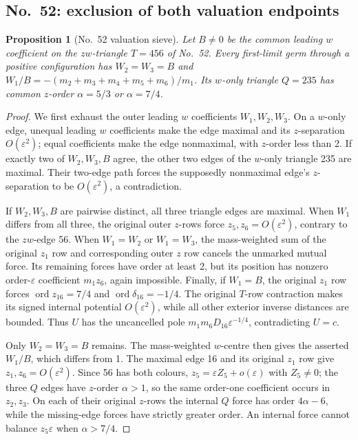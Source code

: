 \documentclass[11pt]{amsart}
\newtheorem{proposition}[theorem]{Proposition}
\theoremstyle{remark}
\newcommand{\ord}{\operatorname{ord}}
\begin{document}
\subsection{No.~52: exclusion of both valuation endpoints}
\begin{proposition}[No.~52 valuation sieve]\label{prop:no52-window}
Let $B\ne0$ be the common leading $w$ coefficient on the $zw$-triangle $T=456$ of No.~52. Every first-limit germ through a positive configuration has $W_2=W_3=B$ and $W_1/B=-(m_2+m_3+m_4+m_5+m_6)/m_1$. Its $w$-only triangle $Q=235$ has common $z$-order $\alpha=5/3$ or $\alpha=7/4$.
\end{proposition}
\begin{proof}
We first exhaust the outer leading $w$ coefficients $W_1,W_2,W_3$. On a $w$-only edge, unequal leading $w$ coefficients make the edge maximal and its $z$-separation $O(\varepsilon^2)$; equal coefficients make the edge nonmaximal, with $z$-order less than 2. If exactly two of $W_2,W_3,B$ agree, the other two edges of the $w$-only triangle 235 are maximal. Their two-edge path forces the supposedly nonmaximal edge's $z$-separation to be $O(\varepsilon^2)$, a contradiction.

If $W_2,W_3,B$ are pairwise distinct, all three triangle edges are maximal. When $W_1$ differs from all three, the original outer $z$-rows force $z_5,z_6=O(\varepsilon^2)$, contrary to the $zw$-edge 56. When $W_1=W_2$ or $W_1=W_3$, the mass-weighted sum of the original $z_1$ row and corresponding outer $z$ row cancels the unmarked mutual force. Its remaining forces have order at least 2, but its position has nonzero order-$\varepsilon$ coefficient $m_1z_6$, again impossible. Finally, if $W_1=B$, the original $z_1$ row forces $\ord z_{16}=7/4$ and $\ord\delta_{16}=-1/4$. The original $T$-row contraction makes its signed internal potential $O(\varepsilon^2)$, while all other exterior inverse distances are bounded. Thus $U$ has the uncancelled pole $m_1m_6D_{16}\varepsilon^{-1/4}$, contradicting $U=c$.

Only $W_2=W_3=B$ remains. The mass-weighted $w$-centre then gives the asserted $W_1/B$, which differs from 1. The maximal edge 16 and its original $z_1$ row give $z_1,z_6=O(\varepsilon^2)$. Since 56 has both colours, $z_5=\varepsilon Z_5+o(\varepsilon)$ with $Z_5\ne0$; the three $Q$ edges have $z$-order $\alpha>1$, so the same order-one coefficient occurs in $z_2,z_3$. On each of their original $z$-rows the internal $Q$ force has order $4\alpha-6$, while the missing-edge forces have strictly greater order. An internal force cannot balance $z_5\varepsilon$ when $\alpha>7/4$.


\end{proof}
\end{document}
